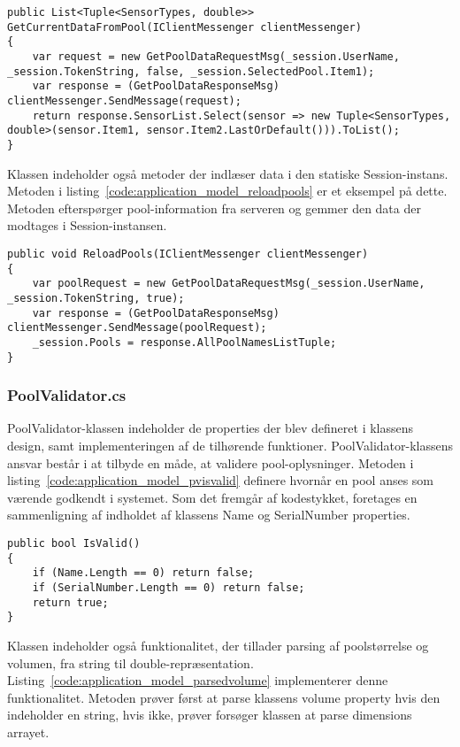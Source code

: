 \begin{lstlisting}[caption={GetCurrentDataFromPool(...)},label={code:application_model_gcdfp}]
public List<Tuple<SensorTypes, double>> GetCurrentDataFromPool(IClientMessenger clientMessenger)
{
	var request = new GetPoolDataRequestMsg(_session.UserName, _session.TokenString, false, _session.SelectedPool.Item1);
	var response = (GetPoolDataResponseMsg) clientMessenger.SendMessage(request);
	return response.SensorList.Select(sensor => new Tuple<SensorTypes, double>(sensor.Item1, sensor.Item2.LastOrDefault())).ToList();
}
\end{lstlisting}

Klassen indeholder også metoder der indlæser data i den statiske Session-instans. Metoden i listing~\ref{code:application_model_reloadpools} er et eksempel på dette. Metoden efterspørger pool-information fra serveren og gemmer den data der modtages i Session-instansen.

\begin{lstlisting}[caption={ReloadPools(...)},label={code:application_model_reloadpools}]
public void ReloadPools(IClientMessenger clientMessenger)
{
	var poolRequest = new GetPoolDataRequestMsg(_session.UserName, _session.TokenString, true);
	var response = (GetPoolDataResponseMsg) clientMessenger.SendMessage(poolRequest);
	_session.Pools = response.AllPoolNamesListTuple;
}
\end{lstlisting}

\subsubsection{PoolValidator.cs}
PoolValidator-klassen indeholder de properties der blev defineret i klassens design, samt implementeringen af de tilhørende funktioner. PoolValidator-klassens ansvar består i at tilbyde en måde, at validere pool-oplysninger. Metoden i listing~\ref{code:application_model_pvisvalid} definere hvornår en pool anses som værende godkendt i systemet. Som det fremgår af kodestykket, foretages en sammenligning af indholdet af klassens Name og SerialNumber properties.

\begin{lstlisting}[caption={IsValid()},label={code:application_model_pvisvalid}]
public bool IsValid()
{
	if (Name.Length == 0) return false;
	if (SerialNumber.Length == 0) return false;
	return true;
}
\end{lstlisting}

Klassen indeholder også funktionalitet, der tillader parsing af poolstørrelse og volumen, fra string til double-repræsentation. Listing~\ref{code:application_model_parsedvolume} implementerer denne funktionalitet. Metoden prøver først at parse klassens volume property hvis den indeholder en string, hvis ikke, prøver forsøger klassen at parse dimensions arrayet.

